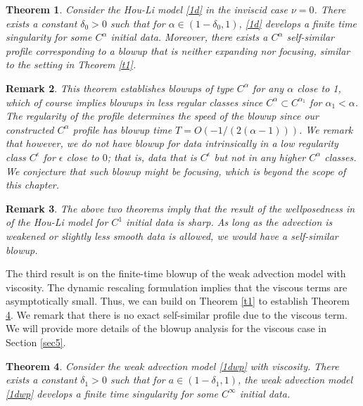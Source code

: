 \documentclass[12pt]{caltech_thesis}
\newtheorem{theorem}{Theorem}[section]
\newtheorem{remark}[theorem]{Remark}
\numberwithin{equation}{section}
\begin{document}
{
\begin{theorem}
\label{t2}
Consider the Hou-Li model \eqref{1d} in the inviscid case $\nu=0$. There exists a constant $\delta_0>0$ such that for $\alpha\in(1-\delta_0,1)$, \eqref{1d} develops a finite time singularity for some $C^{\alpha}$ initial data. Moreover, there exists a $C^{\alpha}$ self-similar profile corresponding to a blowup that is neither expanding nor focusing, similar to the setting in Theorem \ref{t1}.
\end{theorem}
\begin{remark}
    This theorem establishes blowups of type $C^{\alpha}$ for any $\alpha$ close to 1, which of course implies blowups in less regular classes since $C^{\alpha}\subset C^{\alpha_1}$ for $\alpha_1<\alpha$. The regularity of the profile determines the speed of the blowup since our constructed $C^{\alpha}$ profile has blowup time $T=O(-1/(2(\alpha-1)))$. We remark that however, we do not have blowup for data intrinsically in a low regularity class $C^{\epsilon}$ for $\epsilon$ close to $0$; that is, data that is $C^{\epsilon}$ but not in any higher $C^\alpha$ classes. We conjecture that such blowup might be focusing, which is beyond the scope of this chapter.
\end{remark}
\begin{remark}
    The above two theorems imply that the result of the wellposedness in \cite{hou2008dynamic} of the Hou-Li model for $C^1$ initial data is sharp. As long as the advection is weakened or slightly less smooth data is allowed, we would have a self-similar blowup.
\end{remark}}
The third result is on the finite-time blowup of the weak advection model with viscosity. The dynamic rescaling formulation implies that the viscous terms are asymptotically small. Thus, we can build on Theorem \ref{t1} to establish Theorem \ref{t3}. {We remark that there is no exact self-similar profile due to the viscous term.}
We will provide more details of the blowup analysis for the viscous case in Section \ref{sec5}.
\begin{theorem}
\label{t3}
Consider the weak advection model \eqref{1dwp} with viscosity. There exists a constant $\delta_1>0$ such that for $a\in(1-\delta_1,1)$, the weak advection model \eqref{1dwp} develops a finite time singularity for some $C^{\infty}$ initial data.
\end{theorem}

\end{document}
